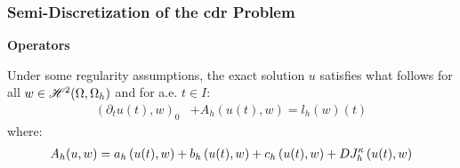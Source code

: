\begin{frame}
    \frametitle{Semi-Discretization of the \acrshort{cdr} Problem}

    \vspace*{\fill}
    \begin{center}
        {\color{\accentcolor} \Large \textbf{Operators}}
        \vspace*{0.25cm}

        \begin{minipage}{0.75\textwidth}
            \begin{definition}
                Under some regularity assumptions, the exact solution $u$ satisfies what follows for all $w \in \mathscr{H}^{2}(\Omega, \Omega_h)$ and for a.e. $t \in I$:
                \begin{align*}
                    \left( \partial_t u(t), w \right)_0 &+ A_h(u(t), w) = l_h \left( w \right) (t)
                \end{align*}
                where:
                \begin{align*}
                    A_h(u, w) = a_h \left( u(t), w \right) + b_h \left( u(t), w \right) + c_h \left( u(t), w \right) + D J^{\kappa}_h \left( u(t), w \right)
                \end{align*}
            \end{definition}
        \end{minipage}
    \end{center}
    \vspace*{\fill}
    
\end{frame}

